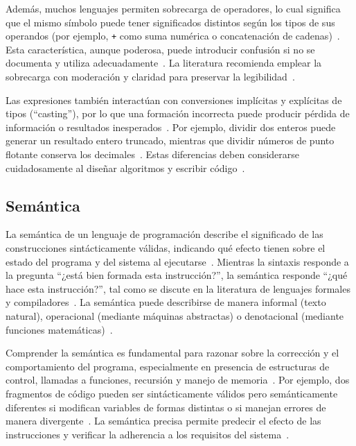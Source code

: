 \documentclass[12pt,twoside]{book}
\begin{document}
						Además, muchos lenguajes permiten sobrecarga de operadores, lo cual significa que el mismo símbolo puede tener significados distintos según los tipos de sus operandos (por ejemplo, \texttt{+} como suma numérica o concatenación de cadenas)~\cite{Tanenbaum2021Structured}. Esta característica, aunque poderosa, puede introducir confusión si no se documenta y utiliza adecuadamente~\cite{Sommerville2015Software}. La literatura recomienda emplear la sobrecarga con moderación y claridad para preservar la legibilidad~\cite{Pressman2019Software}.
						
						Las expresiones también interactúan con conversiones implícitas y explícitas de tipos (``casting''), por lo que una formación incorrecta puede producir pérdida de información o resultados inesperados~\cite{Stallings2021Computer}. Por ejemplo, dividir dos enteros puede generar un resultado entero truncado, mientras que dividir números de punto flotante conserva los decimales~\cite{Gaddis2022Starting}. Estas diferencias deben considerarse cuidadosamente al diseñar algoritmos y escribir código~\cite{Pressman2019Software}.
				
				\subsection{Semántica}
					La semántica de un lenguaje de programación describe el significado de las construcciones sintácticamente válidas, indicando qué efecto tienen sobre el estado del programa y del sistema al ejecutarse~\cite{Tanenbaum2021Structured}. Mientras la sintaxis responde a la pregunta ``¿está bien formada esta instrucción?'', la semántica responde ``¿qué hace esta instrucción?'', tal como se discute en la literatura de lenguajes formales y compiladores~\cite{Stallings2021Computer}. La semántica puede describirse de manera informal (texto natural), operacional (mediante máquinas abstractas) o denotacional (mediante funciones matemáticas)~\cite{Sommerville2015Software}.
					
					Comprender la semántica es fundamental para razonar sobre la corrección y el comportamiento del programa, especialmente en presencia de estructuras de control, llamadas a funciones, recursión y manejo de memoria~\cite{Pressman2019Software}. Por ejemplo, dos fragmentos de código pueden ser sintácticamente válidos pero semánticamente diferentes si modifican variables de formas distintas o si manejan errores de manera divergente~\cite{Gaddis2022Starting}. La semántica precisa permite predecir el efecto de las instrucciones y verificar la adherencia a los requisitos del sistema~\cite{Sommerville2015Software}.
				
\end{document}

